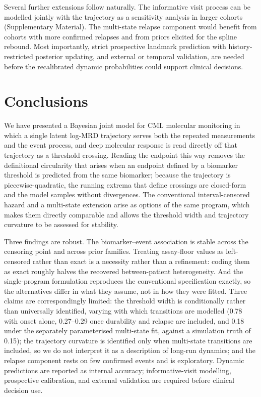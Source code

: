 \documentclass[11pt]{article}
\begin{document}
Several further extensions follow naturally. The informative visit process can be
modelled jointly with the trajectory as a sensitivity analysis in larger
cohorts (Supplementary Material). The multi-state relapse component would
benefit from cohorts with more confirmed relapses and from priors elicited for
the spline rebound. Most importantly, strict prospective landmark prediction
with history-restricted posterior updating, and external or temporal
validation, are needed before the recalibrated dynamic probabilities could
support clinical decisions.

\section{Conclusions}

We have presented a Bayesian joint model for CML molecular monitoring in which a
single latent log-MRD trajectory serves both the repeated measurements and the
event process, and deep molecular response is read directly off that trajectory
as a threshold crossing. Reading the endpoint this way removes the definitional
circularity that arises when an endpoint defined by a biomarker threshold is
predicted from the same biomarker; because the trajectory is
piecewise-quadratic, the running extrema that define crossings are closed-form
and the model samples without divergences. The conventional interval-censored
hazard and a multi-state extension arise as options of the same program, which
makes them directly comparable and allows the threshold width and trajectory
curvature to be assessed for stability.

Three findings are robust. The biomarker--event association is stable across the
censoring point and across prior families. Treating
assay-floor values as left-censored rather than exact is a necessity rather than
a refinement: coding them as exact roughly halves the recovered between-patient
heterogeneity. And the single-program formulation reproduces the conventional
specification exactly, so the alternatives differ in what they assume, not in
how they were fitted. Three claims are correspondingly limited: the threshold
width is conditionally rather than universally identified, varying with which
transitions are modelled (0.78 with onset alone, 0.27--0.29 once durability and
relapse are included, and 0.18 under the separately parameterised multi-state
fit, against a simulation truth of 0.15); the trajectory curvature is identified only when
multi-state transitions are included, so we do not interpret it as a description
of long-run dynamics; and the relapse component rests on few confirmed events
and is exploratory. Dynamic predictions are reported as internal accuracy;
informative-visit modelling, prospective calibration, and external validation
are required before clinical decision use.
\end{document}
